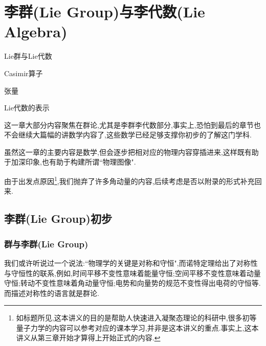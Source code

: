 \ifx\allfiles\undefined



	\else
	\fi
\chapter{李群(Lie Group)与李代数(Lie Algebra)}
\begin{introduction}
	\item Lie群与Lie代数
	\item Casimir算子
	\item 张量
	\item Lie代数的表示
\end{introduction}
这一章大部分内容聚焦在群论,尤其是李群李代数部分,事实上,恐怕到最后的章节也不会继续大篇幅的讲数学内容了,这些数学已经足够支撑你初步的了解这门学科.

虽然这一章的主要内容是数学,但会逐步把相对应的物理内容穿插进来,这样既有助于加深印象,也有助于构建所谓``物理图像".

由于出发点原因\footnote{如标题所见,这本讲义的目的是帮助人快速进入凝聚态理论的科研中,很多初等量子力学的内容可以参考对应的课本学习,并非是这本讲义的重点.事实上,这本讲义从第三章开始才算得上开始正式的内容.},我们抛弃了许多角动量的内容,后续考虑是否以附录的形式补充回来.
\section{李群(Lie Group)初步}
\subsection{群与李群(Lie Group)}
我们或许听说过一个说法:``物理学的关键是对称和守恒",而诺特定理给出了对称性与守恒性的联系,例如,时间平移不变性意味着能量守恒;空间平移不变性意味着动量守恒;转动不变性意味着角动量守恒;电势和向量势的规范不变性得出电荷的守恒等.而描述对称性的语言就是群论.

